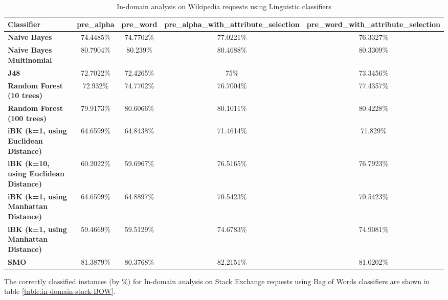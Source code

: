 \documentclass[conference]{IEEEtran}
\begin{document}
\begin{table*}[htbp]
\caption{In-domain analysis on Wikipedia requests using Linguistic classifiers }
\centering
\vspace{5pt}
\begin{tabular}{|l|c|c|c|c|}
\hline
\textbf{Classifier} & \textbf{pre\_alpha} & \textbf{pre\_word} & \textbf{pre\_alpha\_with\_attribute\_selection} & \textbf{pre\_word\_with\_attribute\_selection} \\
\hline\hline
\textbf{Naive Bayes} & 74.4485\% & 74.7702\% & 77.0221\% & 76.3327\% \\ 
\hline
\textbf{Naive Bayes Multinomial} & 80.7904\% & 80.239\% & 80.4688\% & 80.3309\% \\ 
\hline
\textbf{J48} & 72.7022\% & 72.4265\% & 75\% & 73.3456\% \\ 
\hline
\textbf{Random Forest (10 trees)} & 72.932\% & 74.7702\% & 76.7004\% & 77.4357\% \\ 
\hline
\textbf{Random Forest (100 trees)} & 79.9173\% & 80.6066\% & 80.1011\% & 80.4228\% \\ 
\hline
\textbf{iBK (k=1, using Euclidean Distance)} & 64.6599\% & 64.8438\% & 71.4614\% & 71.829\% \\ 
\hline
\textbf{iBK (k=10, using Euclidean Distance)} & 60.2022\% & 59.6967\% & 76.5165\% & 76.7923\% \\ 
\hline
\textbf{iBK (k=1, using Manhattan Distance)} & 64.6599\% & 64.8897\% & 70.5423\% & 70.5423\% \\ 
\hline
\textbf{iBK (k=1, using Manhattan Distance)} & 59.4669\% & 59.5129\% & 74.6783\% & 74.9081\% \\ 
\hline
\textbf{SMO} & 81.3879\% & 80.3768\% & 82.2151\% & 81.0202\% \\ 
\hline
\hline
\end{tabular}
\label{table:in-domain-wiki-Ling}
\end{table*}

The correctly classified instances (by \%) for In-domain analysis on Stack Exchange requests using Bag of Words classifiers are shown in table \ref{table:in-domain-stack-BOW}.
\end{document}
